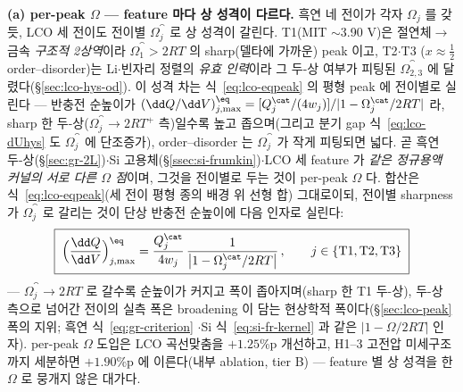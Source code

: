 \textbf{(a) per-peak $\Omega$ --- feature 마다 상 성격이 다르다.} 흑연 네 전이가 각자 $\Omega_j$ 를 갖듯, LCO 세
전이도 전이별 $\Omega_j^\cat$ 로 상 성격이 갈린다. T1(MIT $\sim$3.90 V)은 절연체$\to$금속 \emph{구조적 2상역}이라
$\Omega_1^\cat>2RT$ 의 sharp(델타에 가까운) peak 이고\cite{reimers1992,menetrier1999}, T2$\cdot$T3
($x\!\approx\!\tfrac12$ order--disorder)는 Li$\cdot$빈자리 정렬의 \emph{유효 인력}이라 그 두-상 여부가 피팅된
$\Omega_{2,3}^\cat$ 에 달렸다(\S\ref{sec:lco-hys-od}\cite{vanderven1998,reynier2004}). 이 성격 차는
식~\eqref{eq:lco-eqpeak} 의 평형 peak 에 전이별로 실린다 --- 반충전 순높이가
$(\dd Q/\dd V)^\eq_{j,\max}=[Q_j^\cat/(4w_j)]/|1-\Omega_j^\cat/2RT|$ 라, sharp 한 두-상($\Omega_j^\cat\!\to\!2RT^+$
측)일수록 높고 좁으며(그리고 분기 gap 식~\eqref{eq:lco-dUhys} 도 $\Omega_j^\cat$ 에 단조증가), order--disorder 는
$\Omega_j^\cat$ 가 작게 피팅되면 넓다. 곧 흑연 두-상(\S\ref{sec:gr-2L})$\cdot$Si 고용체(\S\ref{ssec:si-frumkin})$\cdot$LCO
세 feature 가 \emph{같은 정규용액 커널의 서로 다른 $\Omega$ 점}이며, 그것을 전이별로 두는 것이 per-peak $\Omega$ 다.
합산은 식~\eqref{eq:lco-eqpeak}(세 전이 평형 종의 배경 위 선형 합) 그대로이되, 전이별 sharpness 가
$\Omega_j^\cat$ 로 갈리는 것이 단상 반충전 순높이에 다음 인자로 실린다:
\begin{equation}
\boxed{\;\Big(\frac{\dd Q}{\dd V}\Big)^\eq_{j,\max}=\frac{Q_j^\cat}{4w_j}\,\frac{1}{\big|1-\Omega_j^\cat/2RT\big|}\,,
\qquad j\in\{\mathrm{T1,T2,T3}\}\;}
\label{eq:lco-omega-kernel}
\end{equation}
--- $\Omega_j^\cat\!\to\!2RT$ 로 갈수록 순높이가 커지고 폭이 좁아지며(sharp 한 T1 두-상), 두-상 측으로 넘어간
전이의 실측 폭은 broadening 이 담는 현상학적 폭이다(\S\ref{sec:lco-peak} 폭의 지위; 흑연 식~\eqref{eq:gr-criterion}
$\cdot$Si 식~\eqref{eq:si-fr-kernel} 과 같은 $|1-\Omega/2RT|$ 인자). per-peak $\Omega$ 도입은 LCO 곡선맞춤을
$+1.25$\%p 개선하고, H1--3 고전압 미세구조까지 세분하면 $+1.90$\%p 에 이른다(내부 ablation, tier B) --- feature 별
상 성격을 한 $\Omega$ 로 뭉개지 않은 대가다.

